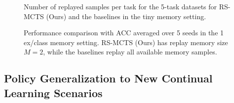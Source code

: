 \begin{figure} %
\begin{minipage}{\textwidth}
	\begin{minipage}[b]{0.38\textwidth}
		\centering
		\setlength{\figwidth}{0.96\textwidth}
		\setlength{\figheight}{.15\textheight}
		
		\vspace{-3mm}
		\caption{Number of replayed samples per task for the 5-task datasets for RS-MCTS (Ours) and the baselines in the tiny memory setting.}
		\label{fig:tiny_memory_usage_5task_datasets}
	\end{minipage}
	\hfill
	\begin{minipage}[b]{0.6\textwidth}
		\centering
		\footnotesize
		\vspace{-3mm}
		\vspace{-3mm}
		\captionsetup{type=table, width=.94\linewidth}
		\caption{Performance comparison with ACC averaged over 5 seeds in the 1 ex/class memory setting. RS-MCTS (Ours) has replay memory size $M=2$, while the baselines replay all available memory samples. }
		\label{tab:efficiency_of_replay_scheduling_5task_datasets}
	\end{minipage}
\end{minipage}
\vspace{-2mm}
\end{figure}



\subsection{Policy Generalization to New Continual Learning Scenarios}

